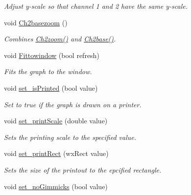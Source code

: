 \begin{DoxyCompactItemize}
\begin{DoxyCompactList}\small\item\em Adjust y-\/scale so that channel 1 and 2 have the same y-\/scale. \item\end{DoxyCompactList}\item 
void \hyperlink{classwxStfGraph_ad71175f64d59ebf89f6b44ff8d2e005d}{Ch2basezoom} ()
\begin{DoxyCompactList}\small\item\em Combines \hyperlink{classwxStfGraph_a4dc6f001a2fdda3d33df44ddbd4511fe}{Ch2zoom()} and \hyperlink{classwxStfGraph_a86c1e7b4a43b2a21287cc74f8ce446d4}{Ch2base()}. \item\end{DoxyCompactList}\item 
void \hyperlink{classwxStfGraph_ad9160a9247942883bd183391d4d23ac9}{Fittowindow} (bool refresh)
\begin{DoxyCompactList}\small\item\em Fits the graph to the window. \item\end{DoxyCompactList}\item 
void \hyperlink{classwxStfGraph_a78be138bbfb1f43726ff692898197914}{set\_\-isPrinted} (bool value)
\begin{DoxyCompactList}\small\item\em Set to true if the graph is drawn on a printer. \item\end{DoxyCompactList}\item 
void \hyperlink{classwxStfGraph_a6e1c5275902f8305e6a97ccda210e303}{set\_\-printScale} (double value)
\begin{DoxyCompactList}\small\item\em Sets the printing scale to the specified value. \item\end{DoxyCompactList}\item 
void \hyperlink{classwxStfGraph_a6e46e77d7c75fb9ed44d7d558ee00f3c}{set\_\-printRect} (wxRect value)
\begin{DoxyCompactList}\small\item\em Sets the size of the printout to the epcified rectangle. \item\end{DoxyCompactList}\item 
void \hyperlink{classwxStfGraph_a03c53f826e73b7cb720e8365f14154b9}{set\_\-noGimmicks} (bool value)

\end{DoxyCompactItemize}
